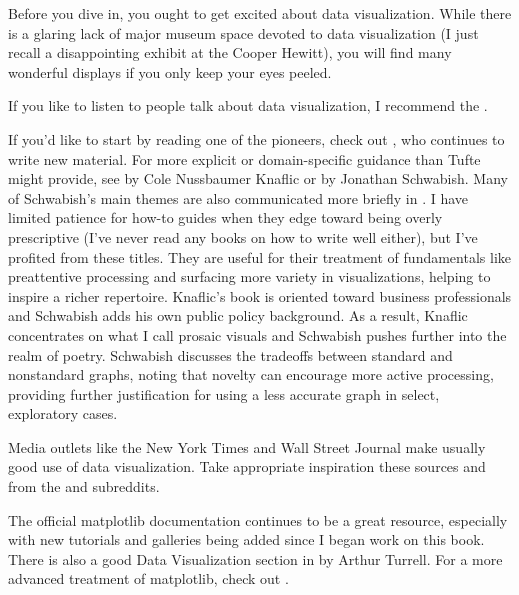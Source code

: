 Before you dive in, you ought to get excited about data visualization. While there is a glaring lack of major museum space devoted to data visualization (I just recall a disappointing exhibit at the Cooper Hewitt), you will find many wonderful displays if you only keep your eyes peeled. 
 
If you like to listen to people talk about data visualization, I recommend the . 

If you'd like to start by reading one of the pioneers, check out , who continues to write new material. For more explicit or domain-specific guidance than Tufte might provide, see  by Cole Nussbaumer Knaflic or  by Jonathan Schwabish. Many of Schwabish's main themes are also communicated more briefly in \cite{schwabish2014economist}. I have limited patience for how-to guides when they edge toward being overly prescriptive (I've never read any books on how to write well either), but I've profited from these titles. They are useful for their treatment of fundamentals like preattentive processing and surfacing more variety in visualizations, helping to inspire a richer repertoire. Knaflic's book is oriented toward business professionals and Schwabish adds his own public policy background. As a result, Knaflic concentrates on what I call prosaic visuals  and Schwabish pushes further into the realm of poetry. Schwabish discusses the tradeoffs between standard and nonstandard graphs, noting that novelty can encourage more active processing, providing further justification for using a less accurate graph in select, exploratory cases.

Media outlets like the New York Times and Wall Street Journal make usually good use of data visualization. Take appropriate inspiration these sources and from the   and  subreddits.

The official matplotlib documentation continues to be a great resource, especially with new tutorials and galleries being added since I began work on this book. There is also a good Data Visualization section in  by Arthur Turrell. For a more advanced treatment of matplotlib, check out .
